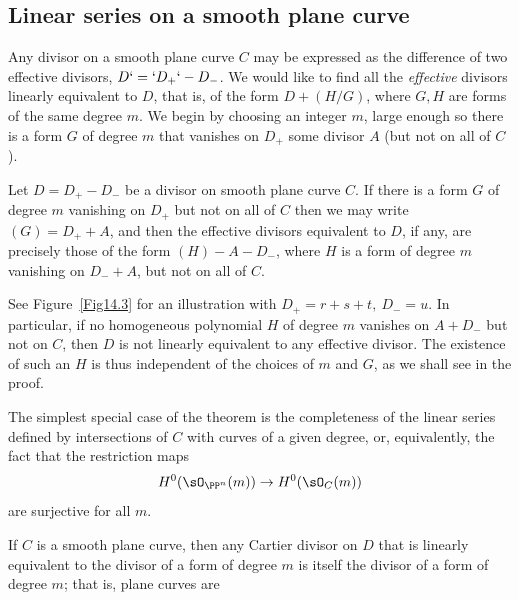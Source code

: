 \subsection{Linear series on a smooth plane curve}\label{linear series on smooth plane curves}

Any divisor on a smooth plane curve $C$ may be expressed as the difference of
%
two 
effective divisors,
$D`=` D_{+}`-\nobreak D_{-}$. We would like to find all the \emph{effective} divisors 
%
linearly equivalent
to $D$, that is, of the form
$D + (H/G)$, where $G, H$ are forms of the same degree $m$. We begin by choosing
an integer $m$, large enough so there is a form $G$ of degree $m$ that vanishes on $D_{+}$ 
some divisor $A$ (but not on all of $C$). 

\begin{theorem}\label{equiv on smooth plane curve}
Let $D= D_{+}-D_{-}$ be a divisor on 
smooth plane curve $C$. If
there is a form $G$ of degree $m$ vanishing on $D_{+}$ but not on all of $C$
then we may write $(G) = D_{+}+A$, and then
the effective divisors equivalent to $D$, if any, are precisely those 
of the form $(H) - A -D_{-}$, where $H$
is a form of degree $m$ vanishing on $D_{-}+A$, but not on all of $C$.
\end{theorem}

See Figure~\ref{Fig14.3} for an illustration with $D_+ = r+s+t, \ D_- = u$.
In particular, if no homogeneous polynomial $H$ of degree $m$ vanishes on  $A + D_{-}$ but not on $C$, then $D$ is not linearly equivalent to any effective divisor. The existence of such an $H$ is thus independent of the choices of $m$ and $G$, as we shall see in the proof.

The simplest special case of the theorem is the completeness
%
of the linear series defined
by intersections of $C$ with curves of a given degree, 
or, equivalently, the fact that the restriction maps
$$
H^{0}(\sO_{\PP^{n}}(m)) \to H^{0}(\sO_{C}(m))
$$
are surjective for all $m$. 

\begin{proposition}\label {completeness of hyperplanes on plane curve}
If $C$ is a smooth plane curve, then any Cartier divisor on $D$ that is linearly equivalent to the divisor of
a form of degree $m$ is itself the divisor of a form of degree $m$; that is, plane curves are
%
\end{proposition}

